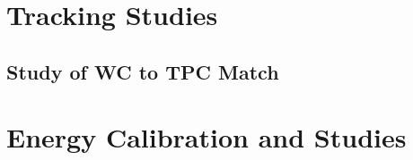 \section{Tracking Studies}\label{sec:TrackingStudies}
\subsection{Study of WC to TPC Match}\label{ch:WC2TPCMatchOptimization}

\section{Energy Calibration and Studies}\label{ch:energyCal} 

